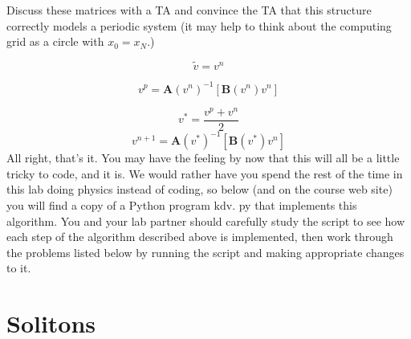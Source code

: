 \begin{problem}\label{P12.2}Discuss these matrices with a TA and convince the TA that this structure correctly models a periodic system (it may help to think about the computing grid as a circle with $x_{0}=x_{N}$.)
\end{problem}
\begin{equation}\label{eq:1210}
\tilde{v}=v^{n}
\end{equation}


\begin{equation}\label{eq:1211}
v^{p}=\mathbf{A}\left(v^{n}\right)^{-1}\left[\mathbf{B}\left(v^{n}\right) v^{n}\right]
\end{equation}

\begin{equation}\label{eq:1212}
v^{*}=\frac{v^{p}+v^{n}}{2}
\end{equation}
\begin{equation}\label{eq:1213}
v^{n+1}=\mathbf{A}\left(v^{*}\right)^{-1}\left[\mathbf{B}\left(v^{*}\right) v^{n}\right]
\end{equation}
All right, that\rq s it. You may have the feeling by now that this will all be a little tricky to code, and it is. We would rather have you spend the rest of the time in this lab doing physics instead of coding, so below (and on the course web site) you will find a copy of a Python program $\mathrm{kdv}$. py that implements this algorithm. You and your lab partner should carefully study the script to see how each step of the algorithm described above is implemented, then work through the problems listed below by running the script and making appropriate changes to it.

\section*{Solitons}

